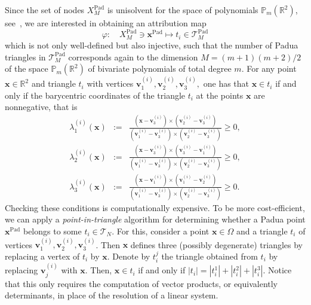 \documentclass{svjour3}
\newcommand{\R}{\mathbb{R}} %
\renewcommand{\P}{\mathbb{P}} %
\begin{document}
Since the set of nodes $ X_M^{\mathrm{Pad}} $ is unisolvent for the space of polynomials $ \P_m\left(\mathbb{R}^2\right)$, see~\cite{Bos;2006:BLI,bos2007bivariate}, we are interested in obtaining an attribution map  
\begin{equation} \label{eq:PPtoPT}
\varphi: \quad X^{\mathrm{Pad}}_M \ni \boldsymbol{x}^{\mathrm{Pad}} \mapsto t_i \in \mathcal{T}^{\mathrm{Pad}}_M
\end{equation}
which is not only well-defined but also injective, such that the number of Padua triangles in $\mathcal{T}^{\mathrm{Pad}}_M$ corresponds again to the dimension $M = (m+1)(m+2)/2$ of the space $\mathbb{P}_m\left(\mathbb{R}^2\right)$ of bivariate polynomials of total degree $m$.  For any point $ \boldsymbol{x} \in \R^2 $ and triangle $ t_i$ with vertices $\boldsymbol{v}^{(i)}_1, \boldsymbol{v}^{(i)}_2, \boldsymbol{v}^{(i)}_3,$ one has that $ \boldsymbol{x} \in t_i$ if and only if the barycentric coordinates of the triangle $t_i$ at the points $\boldsymbol{x}$ are nonnegative, that is
\begin{eqnarray*}
\lambda_{1}^{(i)}({\boldsymbol{
x}})&:=&\frac{\left(\boldsymbol{x}-\boldsymbol{v}^{(i)}_3\right)\times\left(\boldsymbol{v}^{(i)}_2-\boldsymbol{v}^{(i)}_3\right)}{\left(\boldsymbol{v}^{(i)}_1-\boldsymbol{v}^{(i)}_3\right)\times\left(\boldsymbol{v}^{(i)}_2-\boldsymbol{v}^{(i)}_3\right)}\ge0, 
\\ 
\lambda_{2}^{(i)}({\boldsymbol{
x}})&:=&\frac{\left(\boldsymbol{x}-\boldsymbol{v}^{(i)}_3\right)\times\left(\boldsymbol{v}^{(i)}_3-\boldsymbol{v}^{(i)}_1\right)}{\left(\boldsymbol{v}^{(i)}_1-\boldsymbol{v}^{(i)}_3\right)\times\left(\boldsymbol{v}^{(i)}_2-\boldsymbol{v}^{(i)}_3\right)}\ge0, \\
\lambda_{3}^{(i)}({\boldsymbol{
x}})&:=&\frac{\left(\boldsymbol{x}-\boldsymbol{v}^{(i)}_1\right)\times\left(\boldsymbol{v}^{(i)}_1-\boldsymbol{v}^{(i)}_2\right)}{\left(\boldsymbol{v}^{(i)}_1-\boldsymbol{v}^{(i)}_3\right)\times\left(\boldsymbol{v}^{(i)}_2-\boldsymbol{v}^{(i)}_3\right)}\ge0.
\end{eqnarray*}
Checking these conditions is computationally expensive. To be more cost-efficient, we can apply a \emph{point-in-triangle} algorithm \cite{HormannAgathosPIP} for determining whether a Padua point $\boldsymbol{x}^{\mathrm{Pad}}$ belongs to some $ t_i \in \mathcal{T}_N$. For this, consider a point $ \boldsymbol{x} \in \Omega $ and a triangle $ t_i $ of vertices $ \boldsymbol{v}^{(i)}_1, \boldsymbol{v}^{(i)}_2, \boldsymbol{v}^{(i)}_3 $. Then $ \boldsymbol{x} $ defines three (possibly degenerate) triangles by replacing a vertex of $ t_i $ by $ \boldsymbol{x} $. Denote by $ t_i^j $ the triangle obtained from $ t_i $ by replacing $ \boldsymbol{v}^{(i)}_j $ with $ \boldsymbol{x} $. Then, $ \boldsymbol{x} \in t_i $ if and only if $ \left| t_i \right| = \left| t_i^1 \right| + \left| t_i^2 \right| + \left| t_i^3 \right| $. Notice that this only requires the computation of vector products, or equivalently determinants, in place of the resolution of a linear system.
\end{document}
